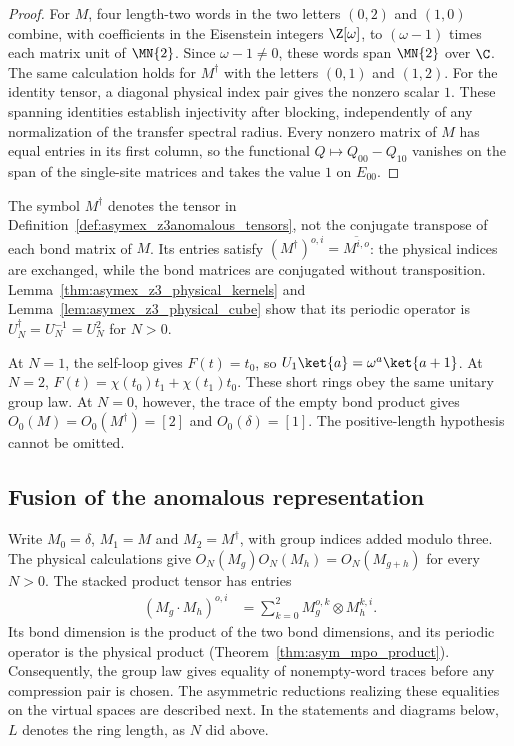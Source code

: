 \begin{proof}
    \leanok
    For $M$, four length-two words in the two letters $(0,2)$ and $(1,0)$
    combine, with coefficients in the Eisenstein integers $\Z[\omega]$,
    to $(\omega-1)$ times each matrix unit of $\MN{2}$.
    Since $\omega-1\neq0$, these words span $\MN{2}$ over $\C$.
    The same calculation holds for $M^\dagger$ with the letters
    $(0,1)$ and $(1,2)$. For the identity tensor, a diagonal physical
    index pair gives the nonzero scalar $1$. These spanning identities
    establish injectivity after blocking, independently of any
    normalization of the transfer spectral radius.
    Every nonzero matrix of $M$ has equal entries in its first column, so
    the functional $Q\mapsto Q_{00}-Q_{10}$ vanishes on the span of the
    single-site matrices and takes the value $1$ on $E_{00}$.
\end{proof}

\begin{remark}
    \label{rem:asymex_z3anomalous_notation}
    The symbol $M^\dagger$ denotes the tensor in
    Definition~\ref{def:asymex_z3anomalous_tensors}, not the conjugate
    transpose of each bond matrix of $M$. Its entries satisfy
    $(M^\dagger)^{o,i}=\overline{M^{i,o}}$: the physical indices are
    exchanged, while the bond matrices are conjugated without
    transposition. Lemma~\ref{thm:asymex_z3_physical_kernels}
    and Lemma~\ref{lem:asymex_z3_physical_cube} show that its periodic operator
    is $U_N^\dagger=U_N^{-1}=U_N^2$ for $N>0$.

    At $N=1$, the self-loop gives $F(t)=t_0$, so
    $U_1\ket{a}=\omega^a\ket{a+1}$.
    At $N=2$, $F(t)=\chi(t_0)t_1+\chi(t_1)t_0$.
    These short rings obey the same unitary group law. At $N=0$, however,
    the trace of the empty bond product gives
    $O_0(M)=O_0(M^\dagger)=[2]$ and $O_0(\delta)=[1]$.
    The positive-length hypothesis cannot be omitted.
\end{remark}

\subsection{Fusion of the anomalous representation}%
\label{sec:asymex_z3anomalous_fusion}

Write $M_0=\delta$, $M_1=M$ and $M_2=M^\dagger$, with group indices
added modulo three. The physical calculations give
$O_N(M_g)O_N(M_h)=O_N(M_{g+h})$ for every $N>0$.
The stacked product tensor has entries
\begin{align}
    (M_g\cdot M_h)^{o,i}
     & =\sum_{k=0}^{2}M_g^{o,k}\otimes M_h^{k,i}.
    \label{eq:asymex_z3_stacked_product}
\end{align}
Its bond dimension is the product of the two bond dimensions, and its
periodic operator is the physical product
(Theorem~\ref{thm:asym_mpo_product}). Consequently, the group law gives
equality of nonempty-word traces before any compression pair is chosen.
The asymmetric reductions realizing these equalities on the virtual
spaces are described next. In the statements and diagrams below, $L$
denotes the ring length, as $N$ did above.

